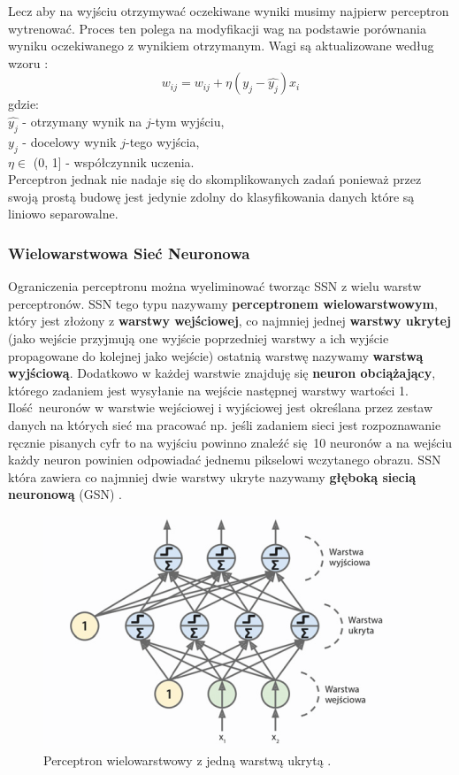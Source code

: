 \documentclass{article}
\begin{document}
Lecz aby na wyjściu otrzymywać oczekiwane wyniki musimy najpierw perceptron wytrenować. Proces
ten polega na modyfikacji wag na podstawie porównania wyniku oczekiwanego z wynikiem otrzymanym.
Wagi są aktualizowane według wzoru \cite{um}:
\begin{equation}
	w_{ij} = w_{ij} + \eta(y_j - \hat{y_j})x_i
\end{equation}
gdzie:\\
$\hat{y_j}$ - otrzymany wynik na $j$-tym wyjściu,\\
$y_j$ - docelowy wynik $j$-tego wyjścia,\\
$\eta \in$ (0, 1] - współczynnik uczenia.\\
Perceptron jednak nie nadaje się do skomplikowanych zadań ponieważ przez swoją prostą budowę
jest jedynie zdolny do klasyfikowania danych które są liniowo separowalne.

\subsubsection{Wielowarstwowa Sieć Neuronowa}
Ograniczenia perceptronu można wyeliminować tworząc SSN z wielu warstw perceptronów.
SSN tego typu nazywamy \textbf{perceptronem wielowarstwowym}, który jest złożony z 
\textbf{warstwy wejściowej}, co najmniej jednej \textbf{warstwy ukrytej} (jako wejście przyjmują
one wyjście poprzedniej warstwy a ich wyjście propagowane do kolejnej jako wejście) ostatnią
warstwę nazywamy \textbf{warstwą wyjściową}. Dodatkowo w każdej warstwie znajduję się 
\textbf{neuron obciążający}, którego zadaniem jest wysyłanie na wejście następnej warstwy 
wartości 1. Ilość neuronów w warstwie wejściowej i wyjściowej jest określana przez
zestaw danych na których sieć ma pracować np. jeśli zadaniem sieci jest rozpoznawanie
ręcznie pisanych cyfr to na wyjściu powinno znaleźć się 10 neuronów a na wejściu każdy neuron
powinien odpowiadać jednemu pikselowi wczytanego obrazu.
SSN która zawiera co najmniej dwie warstwy ukryte nazywamy
\textbf{głęboką siecią neuronową} (GSN) \cite{um}.

\begin{figure}[H]
\centering
\includegraphics[scale=0.5]{gsn.png}
\caption{Perceptron wielowarstwowy z jedną warstwą ukrytą \cite{um}.}
\end{figure}
\end{document}
